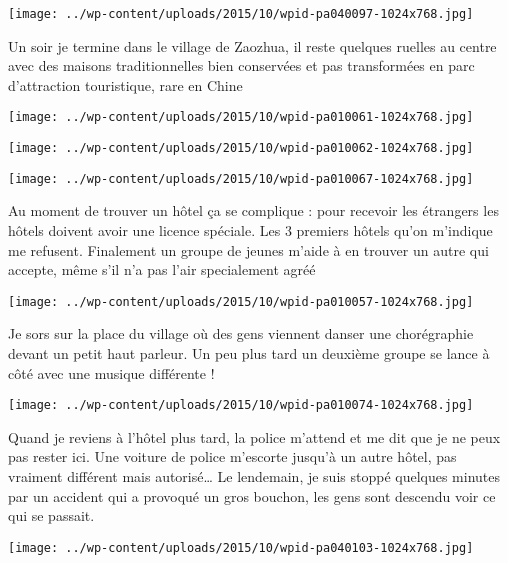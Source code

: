  \newline
\centerline{\texttt{[image: ../wp-content/uploads/2015/10/wpid-pa040097-1024x768.jpg]} } 
 \newline
 Un soir je termine dans le village de Zaozhua, il reste quelques ruelles au centre avec des maisons traditionnelles bien conservées et pas transformées en parc d'attraction touristique, rare en Chine \newline
 \newline
\centerline{\texttt{[image: ../wp-content/uploads/2015/10/wpid-pa010061-1024x768.jpg]} } 
 \newline
 \newline
\centerline{\texttt{[image: ../wp-content/uploads/2015/10/wpid-pa010062-1024x768.jpg]} } 
 \newline
 \newline
\centerline{\texttt{[image: ../wp-content/uploads/2015/10/wpid-pa010067-1024x768.jpg]} } 
 \newline
 Au moment de trouver un hôtel ça se complique : pour recevoir les étrangers les hôtels doivent avoir une licence spéciale. Les 3 premiers hôtels qu'on m'indique me refusent. \newline
 Finalement un groupe de jeunes m'aide à en trouver un autre qui accepte, même s'il n'a pas l'air specialement agréé \newline
 \newline
\centerline{\texttt{[image: ../wp-content/uploads/2015/10/wpid-pa010057-1024x768.jpg]} } 
 \newline
 Je sors sur la place du village où des gens viennent danser une chorégraphie devant un petit haut parleur. Un peu plus tard un deuxième groupe se lance à côté avec une musique différente ! \newline
 \newline
\centerline{\texttt{[image: ../wp-content/uploads/2015/10/wpid-pa010074-1024x768.jpg]} } 
 \newline
 Quand je reviens à l'hôtel plus tard, la police m'attend et me dit que je ne peux pas rester ici. Une voiture de police m'escorte jusqu'à un autre hôtel, pas vraiment différent mais autorisé… \newline
 Le lendemain, je suis stoppé quelques minutes par un accident qui a provoqué un gros bouchon, les gens sont descendu voir ce qui se passait. \newline
 \newline
\centerline{\texttt{[image: ../wp-content/uploads/2015/10/wpid-pa040103-1024x768.jpg]} } 
